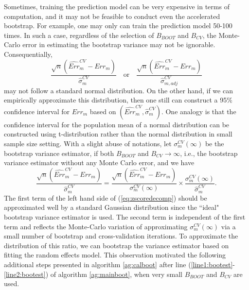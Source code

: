 \documentclass[12pt]{article}
\begin{document}
Sometimes, training the prediction model can be very expensive in terms of computation, and it may not be feasible to conduct even the accelerated bootstrap. For example, one may only can train the prediction model 50-100 times.  In such a case, regardless of the selection of $B_{BOOT}$ and $B_{CV}$, the Monte-Carlo error in estimating the bootstrap variance may not be ignorable. Consequentially, 
$$\frac{\sqrt{n}(\widehat{Err}_m^{CV}-Err_m)}{\widehat{\sigma}_m^{CV}}~~~\mbox{ or }~~~ \frac{\sqrt{n}(\widehat{Err}_m^{CV}-Err_m)}{\widehat{\sigma}_{m, adj}^{CV}}$$
may not follow a standard normal distribution. On the other hand, if we can empirically approximate this distribution, then one still can construct a 95\% confidence interval for $Err_m$ based on $(\widehat{Err}_m^{CV}, \widehat{\sigma}_m^{CV}).$ One analogy is that the confidence interval for the population mean of a normal distribution can be constructed using t-distribution rather than the normal distribution in small sample size setting.  With a slight abuse of notations,  let $\sigma_m^{CV}(\infty)$ be the bootstrap variance estimator, if both $B_{BOOT}$ and $B_{CV} \rightarrow \infty$, i.e., the bootstrap variance estimator without any Monte Carlo error, and we have
\begin{equation}\frac{\sqrt{n}(\widehat{Err}_m^{CV}-Err_m)}{\widehat{\sigma}_m^{CV}}=\frac{\sqrt{n}(\widehat{Err}_m^{CV}-Err_m)}{\sigma_m^{CV}(\infty)}\times \frac{\sigma_m^{CV}(\infty)}{\widehat{\sigma}_m^{CV}}. \label{eq:zscoredecomp}\end{equation}
The first term of the left hand side of (\ref{eq:zscoredecomp}) should be approximated well by a standard Gaussian distribution since the ``ideal" bootstrap variance estimator is used. The second term is independent of the first term and reflects the Monte-Carlo variation of approximating $\sigma_m^{CV}(\infty)$ via a small number of bootstrap and cross-validation iterations. To approximate the distribution of this ratio, we can bootstrap the variance estimator based on fitting the random effects model. This observation motivated the following additional steps presented in algorithm \ref{ag:calboot} after line (\ref{line1:bootest}-\ref{line2:bootest}) of algorithm \ref{ag:mainboot}, when very small $B_{BOOT}$ and $B_{CV}$ are used.
\end{document}
